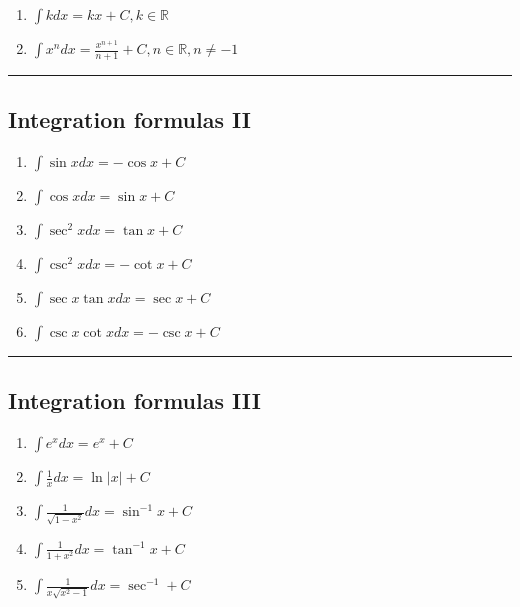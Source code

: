 \documentclass[
  landscape,  
  10pt,
]{article}
\begin{document}
\begin{multicols}{3}
\begin{enumerate}
\def\labelenumi{\arabic{enumi}.}
\item
  \(\displaystyle\int kdx = kx + C, k \in \mathbb{R}\)
\item
  \(\displaystyle\int x^ndx = \frac{x^{n+1}}{n+1}+C, n \in \mathbb{R}, n \neq -1\)
\end{enumerate}

\begin{center}\rule{0.5\linewidth}{0.5pt}\end{center}

\hypertarget{integration-formulas-ii}{%
\subsection{Integration formulas II}\label{integration-formulas-ii}}

\begin{enumerate}
\def\labelenumi{\arabic{enumi}.}
\item
  \(\displaystyle\int \sin xdx = -\cos x + C\)
\item
  \(\displaystyle\int \cos xdx = \sin x + C\)
\item
  \(\displaystyle\int \sec^2xdx = \tan x + C\)
\item
  \(\displaystyle\int \csc^2xdx = -\cot x + C\)
\item
  \(\displaystyle\int \sec x\tan xdx = \sec x + C\)
\item
  \(\displaystyle\int \csc x\cot xdx = -\csc x +C\)
\end{enumerate}

\begin{center}\rule{0.5\linewidth}{0.5pt}\end{center}

\hypertarget{integration-formulas-iii}{%
\subsection{Integration formulas III}\label{integration-formulas-iii}}

\begin{enumerate}
\def\labelenumi{\arabic{enumi}.}
\item
  \(\displaystyle\int e^xdx =e^x +C\)
\item
  \(\displaystyle\int \frac{1}{x}dx=\ln|x|+C\)
\item
  \(\displaystyle\int \frac{1}{\sqrt{1-x^2}}dx = \sin^{-1}x +C\)
\item
  \(\displaystyle\int \frac{1}{1+x^2}dx = \tan^{-1}x +C\)
\item
  \(\displaystyle\int \frac{1}{x\sqrt{x^2-1}}dx= \sec^{-1}+C\)
\end{enumerate}


\end{multicols}
\end{document}
